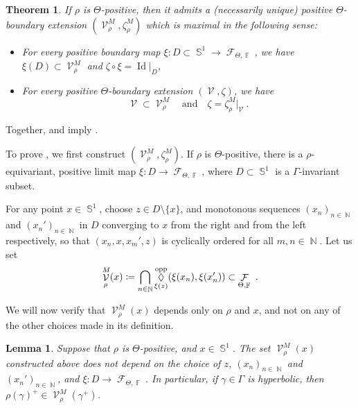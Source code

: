 \documentclass{amsart}
\theoremstyle{plain}
\newtheorem{theorem}[proposition]{Theorem}
\newtheorem{lemma}[proposition]{Lemma}
\theoremstyle{definition}
\DeclareMathOperator{\Id}{Id}
\DeclareMathOperator{\Diam}{\lozenge}
\newcommand{\bdext}{{\Vc^M_\rho}}
\DeclareMathOperator{\Fc}{\mathcal{F}}
\DeclareMathOperator{\Vc}{\mathcal{V}}
\DeclareMathOperator{\Fb}{{\mathbb{F}}}
\DeclareMathOperator{\Nb}{{\mathbb{N}}}
\DeclareMathOperator{\Sb}{\mathbb{S}}
\newcommand*\from{\colon}
\newcommand{\opp}{\textnormal{opp}}
\newcommand{\1}{\mathbf{1}}
\begin{document}
\begin{theorem}\label{prop: converse}
If $\rho$ is $\Theta$-positive, then it admits a (necessarily unique) positive $\Theta$-boundary extension $(\bdext, \zeta^M_\rho)$ which is maximal in the following sense:
\begin{itemize}
    \item For every positive boundary map $\xi \from D \subset \Sb^1 \to \Fc_{\Theta,\Fb}$, we have $\xi(D)\subset \bdext $ and $\zeta \circ \xi = \Id\vert_{ D}$,
    \item For every positive $\Theta$-boundary extension $(\Vc, \zeta)$, we have \[\Vc \subset \bdext \quad\text{and}\quad\zeta= {\zeta^M_\rho}\vert_{ \Vc}~.\]
\end{itemize}
\end{theorem}

Together,  and  imply .

 
To prove , we first construct $(\bdext, \zeta^M_\rho)$. If $\rho$ is $\Theta$-positive, there is a $\rho$-equivariant, positive limit map $\xi \from D\to \Fc_{\Theta,\Fb}$, where $D\subset \Sb^1$ is a $\Gamma$-invariant subset. 

For any point $x\in\Sb^1$, choose $z\in D\setminus\{x\}$, and monotonous sequences $(x_n)_{n\in\Nb}$ and $(x_n')_{n\in\Nb}$ in $D$ converging to $x$ from the right and from the left respectively, so that $(x_n,x,x_m',z)$ is cyclically ordered for all $m,n\in\Nb$. Let us set 
\[\bdext(x) \coloneqq \bigcap_{n\in\Nb} \Diam^\opp_{\xi(z)}(\xi(x_n),\xi(x_n')) \subset \Fc_{\Theta,\Fb}~.\]


We will now verify that $\bdext(x)$ depends only on $\rho$ and $x$, and not on any of the other choices made in its definition.

\begin{lemma}\label{lemma: boundary extension pointwise independence}
Suppose that $\rho$ is $\Theta$-positive, and $x\in\Sb^1$. The set $\bdext(x)$ constructed above does not depend on the choice of $z$, $(x_n)_{n\in\Nb}$ and $(x_n')_{n\in\Nb}$, and $\xi:D\to \Fc_{\Theta,\Fb}$. In particular, if $\gamma\in\Gamma$ is hyperbolic, then $\rho(\gamma)^+\in\bdext(\gamma^+)$.
\end{lemma}
\end{document}
